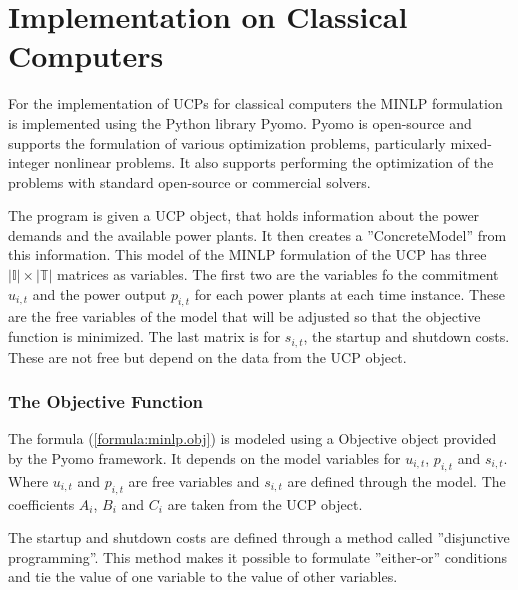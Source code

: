 \section{Implementation on Classical Computers}

For the implementation of UCPs for classical computers
the MINLP formulation is implemented using the Python library Pyomo.
Pyomo is open-source and supports the formulation of various optimization problems,
particularly mixed-integer nonlinear problems.
It also supports performing the optimization of the problems
with standard open-source or commercial solvers.
\cite{hart2011pyomo}

The program is given a UCP object, that holds information
about the power demands and the available power plants.
It then creates a ''ConcreteModel'' from this information.
This model of the MINLP formulation of the UCP
has three $| \mathbb{I} | \times | \mathbb{T} |$ matrices as variables.
The first two are the variables fo the commitment $u_{i, t}$
and the power output $p_{i, t}$ for each power plants at each time instance.
These are the free variables of the model that will be adjusted so that the objective function is minimized.
The last matrix is for $s_{i, t}$, the startup and shutdown costs.
These are not free but depend on the data from the UCP object.

\subsubsection{The Objective Function}

The formula (\ref{formula:minlp.obj}) is modeled using a Objective object provided by the Pyomo framework.
It depends on the model variables for $u_{i, t}$, $p_{i, t}$ and $s_{i, t}$.
Where $u_{i, t}$ and $p_{i, t}$ are free variables and $s_{i, t}$ are defined through the model.
The coefficients $A_i$, $B_i$ and $C_i$ are taken from the UCP object.

The startup and shutdown costs are defined through a method called ''disjunctive programming''.
This method makes it possible to formulate ''either-or'' conditions
and tie the value of one variable to the value of other variables.
\cite{Balas1983}

